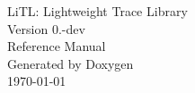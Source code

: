 \documentclass{book}
\begin{document}
\hypersetup{pageanchor=false,citecolor=blue}
\begin{titlepage}
\vspace*{7cm}
\begin{center}
{\LARGE LiTL: Lightweight Trace Library }\\[2mm]
{\large Version 0.-\/dev }\\
\vspace*{1cm}
{\LARGE Reference Manual}\\
\vspace*{1cm}
{\large Generated by Doxygen}\\
\vspace*{0.5cm}
{\today\ \currenttime}\\
\end{center}
\end{titlepage}
\clearemptydoublepage
{}
\tableofcontents
\clearemptydoublepage
{}
\end{document}
